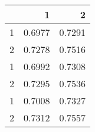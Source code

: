 \begin{tabular}{lrr}
\toprule
{} &       1 &       2 \\
\midrule
1 &  0.6977 &  0.7291 \\
2 &  0.7278 &  0.7516 \\
1 &  0.6992 &  0.7308 \\
2 &  0.7295 &  0.7536 \\
1 &  0.7008 &  0.7327 \\
2 &  0.7312 &  0.7557 \\
\bottomrule
\end{tabular}
